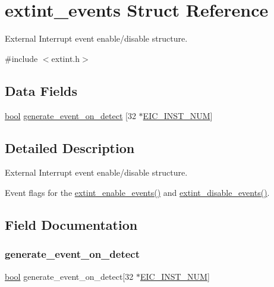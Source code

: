 \hypertarget{structextint__events}{}\section{extint\+\_\+events Struct Reference}
\label{structextint__events}


External Interrupt event enable/disable structure.  




{\ttfamily \#include $<$extint.\+h$>$}

\subsection*{Data Fields}
\begin{DoxyCompactItemize}
\item 
\mbox{\hyperlink{group__group__sam0__utils_ga97a80ca1602ebf2303258971a2c938e2}{bool}} \mbox{\hyperlink{structextint__events_a077b997505baa51601a12b71027f1c02}{generate\+\_\+event\+\_\+on\+\_\+detect}} \mbox{[}32 $\ast$\mbox{\hyperlink{group___s_a_m_d21_j18_a__base_ga60399071a15698b02e60c024082fcaee}{E\+I\+C\+\_\+\+I\+N\+S\+T\+\_\+\+N\+UM}}\mbox{]}
\end{DoxyCompactItemize}


\subsection{Detailed Description}
External Interrupt event enable/disable structure. 

Event flags for the \mbox{\hyperlink{group__asfdoc__sam0__extint__group_gadbcf557b05082e2d25111e3ad9e3385e}{extint\+\_\+enable\+\_\+events()}} and \mbox{\hyperlink{group__asfdoc__sam0__extint__group_ga1e150eaf8dde1371cb31111f5feae5e4}{extint\+\_\+disable\+\_\+events()}}. 

\subsection{Field Documentation}
\mbox{\label{structextint__events_a077b997505baa51601a12b71027f1c02}} 
\subsubsection{\texorpdfstring{generate\_event\_on\_detect}{generate\_event\_on\_detect}}
{\footnotesize\ttfamily \mbox{\hyperlink{group__group__sam0__utils_ga97a80ca1602ebf2303258971a2c938e2}{bool}} generate\+\_\+event\+\_\+on\+\_\+detect\mbox{[}32 $\ast$\mbox{\hyperlink{group___s_a_m_d21_j18_a__base_ga60399071a15698b02e60c024082fcaee}{E\+I\+C\+\_\+\+I\+N\+S\+T\+\_\+\+N\+UM}}\mbox{]}}


